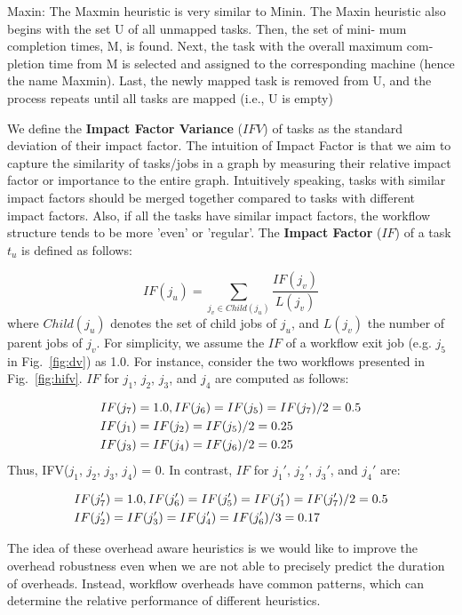 \documentclass[final]{IEEEtran}
\begin{document}
Maxin: The Maxmin heuristic is very similar to Minin. The Maxin heuristic also begins with the set U of all unmapped tasks. Then, the set of mini- mum completion times, M, is found. Next, the task with the overall maximum com- pletion time from M is selected and assigned to the corresponding machine (hence the name Maxmin). Last, the newly mapped task is removed from U, and the process repeats until all tasks are mapped (i.e., U is empty) 


We define the \textbf{Impact Factor Variance} ($IFV$) of tasks as the standard deviation of their impact factor. The intuition of Impact Factor is that we aim to capture the similarity of tasks/jobs in a graph by measuring their relative impact factor or importance to the entire graph. Intuitively speaking, tasks with similar impact factors should be merged together compared to tasks with different impact factors. Also, if all the tasks have similar impact factors, the workflow structure tends to be more 'even' or 'regular'. The \textbf{Impact Factor} ($IF$) of a task $t_u$ is defined as follows:

\begin{equation}
	IF(j_u)=\sum_{j_v\in Child(j_u)}^{}\frac{IF(j_v)}{L(j_v)}
\end{equation}
where $Child(j_u)$ denotes the set of child jobs of $j_u$, and $L(j_v)$ the number of parent jobs of $j_v$. For simplicity, we assume the $IF$ of a workflow exit job (e.g. $j_5$ in Fig.~\ref{fig:dv}) as 1.0. For instance, consider the two workflows presented in Fig.~\ref{fig:hifv}. $IF$ for $j_1$, $j_2$, $j_3$, and $j_4$ are computed as follows:

\begin{eqnarray}
	\displaystyle  
	&IF(j_7 )=1.0, IF(j_6 )=IF(j_5 )=IF(j_7 )/2=0.5\nonumber  \\
	&IF(j_1 )=IF(j_2 )=IF(j_5 )/2=0.25\nonumber \\
	&IF(j_3 )=IF(j_4 )=IF(j_6 )/2=0.25\nonumber 
\end{eqnarray}
Thus, IFV($j_1$, $j_2$, $j_3$, $j_4$) = 0. In contrast, $IF$ for $j_1'$, $j_2'$, $j_3'$, and $j_4'$ are:

\begin{eqnarray}
	\displaystyle  
	&IF(j_7')=1.0, IF(j_6')=IF(j_5')=IF(j_1')=IF(j_7')/2=0.5\nonumber \\
	&IF(j_2')=IF(j_3')=IF(j_4')=IF(j_6')/3=0.17 \nonumber
\end{eqnarray}



The idea of these overhead aware heuristics is we would like to improve the overhead robustness even when we are not able to precisely predict the duration of overheads. Instead, workflow overheads have common patterns, which can determine the relative performance of different heuristics. 
\end{document}
